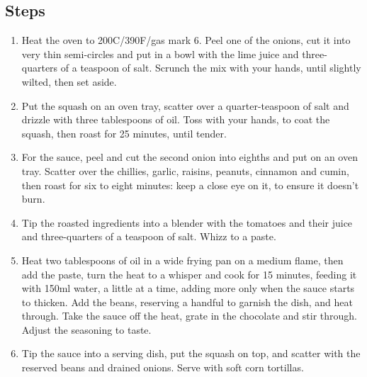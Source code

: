 \documentclass{book}
\begin{document}
\subsection*{Steps}
\begin{enumerate}
\item Heat the oven to 200C/390F/gas mark 6. Peel one of the onions, cut it into very thin semi-circles and put in a bowl with the lime juice and three-quarters of a teaspoon of salt. Scrunch the mix with your hands, until slightly wilted, then set aside.
\item Put the squash on an oven tray, scatter over a quarter-teaspoon of salt and drizzle with three tablespoons of oil. Toss with your hands, to coat the squash, then roast for 25 minutes, until tender.
\item For the sauce, peel and cut the second onion into eighths and put on an oven tray. Scatter over the chillies, garlic, raisins, peanuts, cinnamon and cumin, then roast for six to eight minutes: keep a close eye on it, to ensure it doesn’t burn.
\item Tip the roasted ingredients into a blender with the tomatoes and their juice and three-quarters of a teaspoon of salt. Whizz to a paste.
\item Heat two tablespoons of oil in a wide frying pan on a medium flame, then add the paste, turn the heat to a whisper and cook for 15 minutes, feeding it with 150ml water, a little at a time, adding more only when the sauce starts to thicken. Add the beans, reserving a handful to garnish the dish, and heat through. Take the sauce off the heat, grate in the chocolate and stir through. Adjust the seasoning to taste.
\item Tip the sauce into a serving dish, put the squash on top, and scatter with the reserved beans and drained onions. Serve with soft corn tortillas.
\end{enumerate}
\newpage
\end{document}
